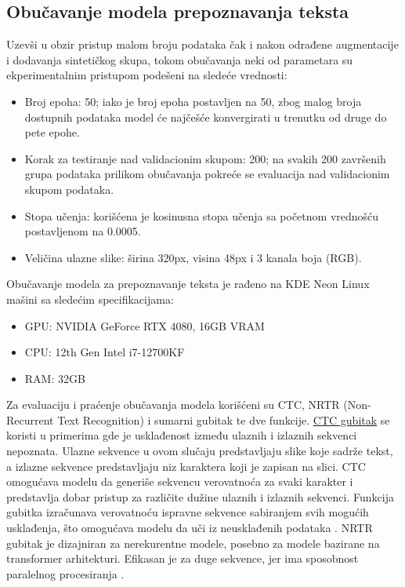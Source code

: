 \documentclass[a4paper,12pt]{article}
\begin{document}
	\subsection{Obučavanje modela prepoznavanja teksta}
	Uzevši u obzir pristup malom broju podataka čak i nakon odrađene augmentacije i dodavanja sintetičkog skupa, tokom obučavanja neki od parametara su ekperimentalnim pristupom podešeni na sledeće vrednosti:
	\begin{itemize}
		\item Broj epoha: 50; iako je broj epoha postavljen na 50, zbog malog broja dostupnih podataka model će najčešće konvergirati u trenutku od druge do pete epohe.
		\item Korak za testiranje nad validacionim skupom: 200; na svakih 200 završenih grupa podataka prilikom obučavanja pokreće se evaluacija nad validacionim skupom podataka.
		\item Stopa učenja: korišćena je kosinusna stopa učenja sa početnom vrednošću postavljenom na 0.0005.
		\item Veličina ulazne slike: širina 320px, visina 48px i 3 kanala boja (RGB).
	\end{itemize}
	
	Obučavanje modela za prepoznavanje teksta je rađeno na KDE Neon Linux mašini sa sledećim specifikacijama:
	\begin{itemize}
		\item GPU: NVIDIA GeForce RTX 4080, 16GB VRAM
		\item CPU: 12th Gen Intel i7-12700KF
		\item RAM: 32GB
	\end{itemize}

	Za evaluaciju i praćenje obučavanja modela korišćeni su CTC, NRTR (Non-Recurrent Text Recognition) i sumarni gubitak te dve funkcije. \href{https://paperswithcode.com/method/ctc-loss}{CTC gubitak} se koristi u primerima gde je usklađenost između ulaznih i izlaznih sekvenci nepoznata. Ulazne sekvence u ovom slučaju predstavljaju slike koje sadrže tekst, a izlazne sekvence predstavljaju niz karaktera koji je zapisan na slici. CTC omogućava modelu da generiše sekvencu verovatnoća za svaki karakter i predstavlja dobar pristup za različite dužine ulaznih i izlaznih sekvenci. Funkcija gubitka izračunava verovatnoću ispravne sekvence sabiranjem svih mogućih usklađenja, što omogućava modelu da uči iz neusklađenih podataka \cite{inproceedings}. NRTR gubitak je dizajniran za nerekurentne modele, posebno za modele bazirane na transformer arhitekturi. Efikasan je za duge sekvence, jer ima sposobnost paralelnog procesiranja \cite{hu2020gtcguidedtrainingctc}.
	
\end{document}
